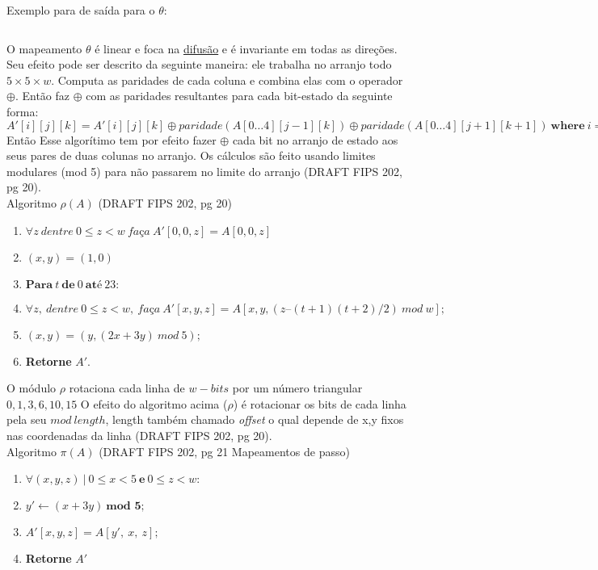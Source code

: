 \documentclass[12pt, a4paper]{article}
\begin{document}
\begin{enumerate}
\begin{enumerate}
Exemplo para de saída para o $\theta$:
\begin{verbatim}
\end{verbatim}

O mapeamento $\theta$ é linear e foca na \underline{difusão} e é invariante em
todas as direções. Seu efeito pode ser descrito da seguinte maneira: ele
trabalha no arranjo todo $5 \times 5 \times w$. Computa as paridades de cada
coluna e combina elas com o operador $\oplus$. Então faz $\oplus$ com as
paridades resultantes para cada bit-estado da seguinte forma: $A'[i][j][k] =
A'[i][j][k] \oplus paridade(A[0\ldots4][j-1][k]) \oplus
paridade(A[0\ldots4][j+1][k+1])\ \textbf{where}\
i=0\ldots4;j=0\ldots4;k=0\ldots(w-1)$ Então Esse algorítimo tem por efeito fazer
$\oplus$ cada bit no arranjo de estado aos seus pares de duas colunas no
arranjo. Os cálculos são feito usando limites modulares (mod 5) para não
passarem no limite do arranjo (DRAFT FIPS 202, pg 20).\\

Algoritmo $\rho(A)$ (DRAFT FIPS 202, pg 20)
  \begin{enumerate}
    \item $\forall z\ \textit{dentre}\ 0 \le z < w\ \textit{faça}\ A'[0, 0,
    z] = A[0, 0, z]$

    \item $(x, y) = (1, 0)$

    \item $\textbf{Para}\ t\ \textbf{de}\ 0\ \textbf{até}\ 23:$

    \item[] \quad $\forall z,\ \textit{dentre}\ 0 \le z < w,\
    \textit{faça}\ A'[x, y, z] = A[x, y, (z – (t + 1)(t + 2)/2)\ \textit{mod}\
    w];$

    \item[] \quad $(x, y) = (y, (2x + 3y)\ \textit{mod}\ 5);$

    \item \textbf{Retorne} $A'$.\\
  \end{enumerate}

O módulo $\rho$ rotaciona cada linha de $w-bits$  por um número triangular
$0,1,3,6,10,15$ O efeito do algoritmo acima ($\rho$) é rotacionar os bits de
cada linha pela seu $\textit{mod}\ length$, length também chamado
\textit{offset} o qual depende de x,y fixos nas coordenadas da linha (DRAFT FIPS
202, pg 20).\\

Algoritmo $\pi(A)$ (DRAFT FIPS 202, pg 21 Mapeamentos de passo)
  \begin{enumerate}
    \item $\forall (x,y,z)\ |\ 0 \le x < 5\ \textbf{e}\ 0 \le z < w:$
    \item[] \quad $y' \leftarrow (x+3y)\ \textbf{mod 5};$
    \item[] \quad $A'[x,y,z]=A[y',\ x,\ z];$
    \item \textbf{Retorne} $A'$\\
  \end{enumerate}


\end{enumerate}
\end{enumerate}
\end{document}
